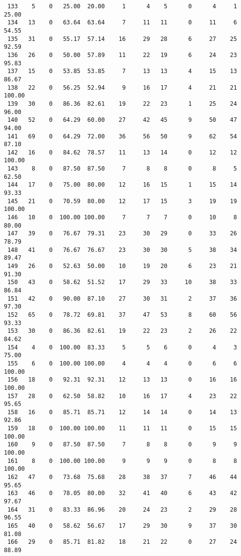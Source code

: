 \begin{verbatim}
 133    5    0   25.00  20.00     1      4    5      0      4     1    25.00
 134   13    0   63.64  63.64     7     11   11      0     11     6    54.55
 135   31    0   55.17  57.14    16     29   28      6     27    25    92.59
 136   26    0   50.00  57.89    11     22   19      6     24    23    95.83
 137   15    0   53.85  53.85     7     13   13      4     15    13    86.67
 138   22    0   56.25  52.94     9     16   17      4     21    21   100.00
 139   30    0   86.36  82.61    19     22   23      1     25    24    96.00
 140   52    0   64.29  60.00    27     42   45      9     50    47    94.00
 141   69    0   64.29  72.00    36     56   50      9     62    54    87.10
 142   16    0   84.62  78.57    11     13   14      0     12    12   100.00
 143    8    0   87.50  87.50     7      8    8      0      8     5    62.50
 144   17    0   75.00  80.00    12     16   15      1     15    14    93.33
 145   21    0   70.59  80.00    12     17   15      3     19    19   100.00
 146   10    0  100.00 100.00     7      7    7      0     10     8    80.00
 147   39    0   76.67  79.31    23     30   29      0     33    26    78.79
 148   41    0   76.67  76.67    23     30   30      5     38    34    89.47
 149   26    0   52.63  50.00    10     19   20      6     23    21    91.30
 150   43    0   58.62  51.52    17     29   33     10     38    33    86.84
 151   42    0   90.00  87.10    27     30   31      2     37    36    97.30
 152   65    0   78.72  69.81    37     47   53      8     60    56    93.33
 153   30    0   86.36  82.61    19     22   23      2     26    22    84.62
 154    4    0  100.00  83.33     5      5    6      0      4     3    75.00
 155    6    0  100.00 100.00     4      4    4      0      6     6   100.00
 156   18    0   92.31  92.31    12     13   13      0     16    16   100.00
 157   28    0   62.50  58.82    10     16   17      4     23    22    95.65
 158   16    0   85.71  85.71    12     14   14      0     14    13    92.86
 159   18    0  100.00 100.00    11     11   11      0     15    15   100.00
 160    9    0   87.50  87.50     7      8    8      0      9     9   100.00
 161    8    0  100.00 100.00     9      9    9      0      8     8   100.00
 162   47    0   73.68  75.68    28     38   37      7     46    44    95.65
 163   46    0   78.05  80.00    32     41   40      6     43    42    97.67
 164   31    0   83.33  86.96    20     24   23      2     29    28    96.55
 165   40    0   58.62  56.67    17     29   30      9     37    30    81.08
 166   29    0   85.71  81.82    18     21   22      0     27    24    88.89

\end{verbatim}
